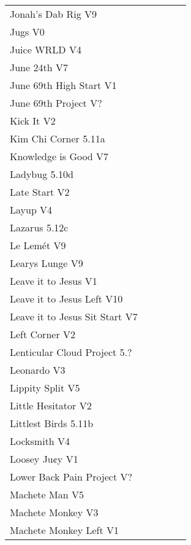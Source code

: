 \begin{flushleft}
\begin{center}
\begin{supertabular}{p{0.76\linewidth}p{0.08\linewidth}}
Jonah's Dab Rig V9 & \pageref{rt:Jonah's Dab Rig} \\
Jugs V0 & \pageref{rt:Jugs} \\
Juice WRLD V4 & \pageref{vr:Juice WRLD} \\
June 24th V7 & \pageref{rt:June 24th} \\
June 69th High Start V1 & \pageref{vr:June 69th High Start} \\
June 69th Project V? & \pageref{rt:June 69th Project} \\
Kick It V2 & \pageref{rt:Kick It} \\
Kim Chi Corner 5.11a & \pageref{rt:Kim Chi Corner} \\
Knowledge is Good V7 & \pageref{vr:Knowledge is Good} \\
Ladybug 5.10d & \pageref{rt:Ladybug} \\
Late Start V2 & \pageref{vr:Late Start} \\
Layup V4 & \pageref{vr:Layup} \\
Lazarus 5.12c & \pageref{vr:Lazarus} \\
Le Lemét V9 & \pageref{rt:Le Lemét} \\
Learys Lunge V9 & \pageref{vr:Learys Lunge} \\
Leave it to Jesus V1 & \pageref{rt:Leave it to Jesus} \\
Leave it to Jesus Left V10 & \pageref{vr:Leave it to Jesus Left} \\
Leave it to Jesus Sit Start V7 & \pageref{vr:Leave it to Jesus Sit Start} \\
Left Corner V2 & \pageref{rt:Left Corner} \\
Lenticular Cloud Project 5.? & \pageref{rt:Lenticular Cloud Project} \\
Leonardo V3 & \pageref{rt:Leonardo} \\
Lippity Split V5 & \pageref{rt:Lippity Split} \\
Little Hesitator V2 & \pageref{rt:June 1} \\
Littlest Birds 5.11b & \pageref{rt:Littlest Birds} \\
Locksmith V4 & \pageref{rt:Locksmith} \\
Loosey Ju¢y V1 & \pageref{rt:Loosey Ju¢y} \\
Lower Back Pain Project V? & \pageref{vr:Lower Back Pain Project} \\
Machete Man V5 & \pageref{vr:Machete Man} \\
Machete Monkey V3 & \pageref{rt:Machete Monkey} \\
Machete Monkey Left V1 & \pageref{vr:Machete Monkey Left} \\

\end{supertabular}
\end{center}
\end{flushleft}
